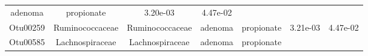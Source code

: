 \documentclass[11pt,]{article}
\begin{document}
\begin{longtable}[]{@{}ccccccc@{}}
\begin{minipage}[t]{0.09\columnwidth}
adenoma\strut
\end{minipage} & \begin{minipage}[t]{0.11\columnwidth}\centering\strut
propionate\strut
\end{minipage} & \begin{minipage}[t]{0.09\columnwidth}\centering\strut
3.20e-03\strut
\end{minipage} & \begin{minipage}[t]{0.09\columnwidth}\centering\strut
4.47e-02\strut
\end{minipage}\tabularnewline
\begin{minipage}[t]{0.09\columnwidth}\centering\strut
Otu00259\strut
\end{minipage} & \begin{minipage}[t]{0.17\columnwidth}\centering\strut
Ruminococcaceae\strut
\end{minipage} & \begin{minipage}[t]{0.17\columnwidth}\centering\strut
Ruminococcaceae\strut
\end{minipage} & \begin{minipage}[t]{0.09\columnwidth}\centering\strut
adenoma\strut
\end{minipage} & \begin{minipage}[t]{0.11\columnwidth}\centering\strut
propionate\strut
\end{minipage} & \begin{minipage}[t]{0.09\columnwidth}\centering\strut
3.21e-03\strut
\end{minipage} & \begin{minipage}[t]{0.09\columnwidth}\centering\strut
4.47e-02\strut
\end{minipage}\tabularnewline
\begin{minipage}[t]{0.09\columnwidth}\centering\strut
Otu00585\strut
\end{minipage} & \begin{minipage}[t]{0.17\columnwidth}\centering\strut
Lachnospiraceae\strut
\end{minipage} & \begin{minipage}[t]{0.17\columnwidth}\centering\strut
Lachnospiraceae\strut
\end{minipage} & \begin{minipage}[t]{0.09\columnwidth}\centering\strut
adenoma\strut
\end{minipage} & \begin{minipage}[t]{0.11\columnwidth}\centering\strut
propionate\strut
\end{minipage} & \begin{minipage}[t]{0.09\columnwidth}\centering\strut

\end{minipage}
\end{longtable}
\end{document}
